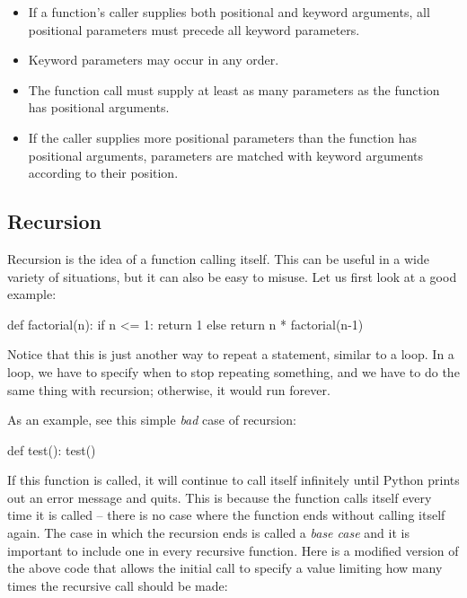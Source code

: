 \documentclass[11pt]{cselabheader}
\begin{document}
\begin{itemize}
  \item If a function's caller supplies both positional and keyword arguments,
    all positional parameters must precede all keyword parameters.
  \item Keyword parameters may occur in any order.
  \item The function call must supply at least as many parameters as the
    function has positional arguments.
  \item If the caller supplies more positional parameters than the function has
    positional arguments, parameters are matched with keyword arguments
    according to their position.
\end{itemize}

\subsection{Recursion}
\label{subsec:recur}
Recursion is the idea of a function calling itself. This can be useful in a wide
variety of situations, but it can also be easy to misuse. Let us first look at a
good example:

\begin{python3code}
def factorial(n):
  if n <= 1:
    return 1
  else
    return n * factorial(n-1)
\end{python3code}

Notice that this is just another way to repeat a statement, similar to a loop.
In a loop, we have to specify when to stop repeating something, and we have to
do the same thing with recursion; otherwise, it would run forever.

As an example, see this simple \emph{bad} case of recursion:

\begin{python3code}
def test():
    test()
\end{python3code}

If this function is called, it will continue to call itself infinitely until
Python prints out an error message and quits. This is because the function calls
itself every time it is called -- there is no case where the function ends
without calling itself again. The case in which the recursion ends is called a
\emph{base case} and it is important to include one in every recursive function.
Here is a modified version of the above code that allows the initial call to
specify a value limiting how many times the recursive call should be made:
\end{document}
